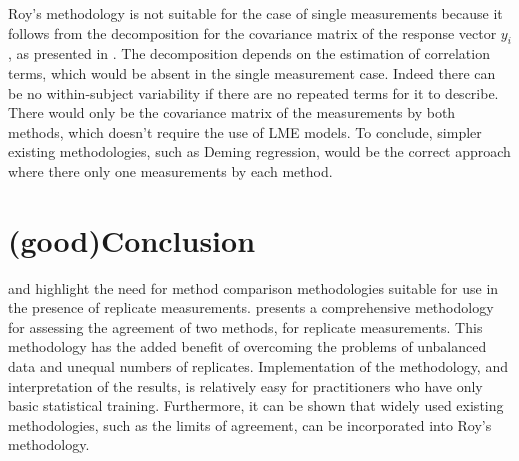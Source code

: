 \documentclass[12pt, a4paper]{report}
\theoremstyle{plain}
\theoremstyle{definition}
\theoremstyle{remark}
\begin{document}
		Roy's methodology is not suitable for the case of single measurements because it follows from the decomposition for the covariance matrix of the response vector $y_{i}$, as presented in \citet{hamlett}. The decomposition depends on the estimation of correlation terms, which would be absent in the single measurement case. Indeed there can be no within-subject variability if there are no repeated terms for it to describe. There would only be the covariance matrix of the measurements by both methods, which doesn't require the use of LME models. To conclude, simpler existing methodologies, such as Deming regression, would be the correct approach where there only one measurements by each method.
		
		
		
		




	\section{ (good)Conclusion}
	\citet{BXC2008} and \citet{Aroy2009} highlight the need for method comparison methodologies suitable for use in the presence of replicate measurements. \citet{Aroy2009} presents a comprehensive methodology for assessing the agreement of two methods, for replicate measurements. This methodology has the added benefit of overcoming the problems of unbalanced data and unequal numbers of replicates. Implementation of the methodology, and interpretation of the results, is relatively easy for practitioners who have only basic statistical training. Furthermore, it can be shown that widely used existing methodologies, such as the limits of agreement, can be incorporated into Roy's methodology.




\end{document}
